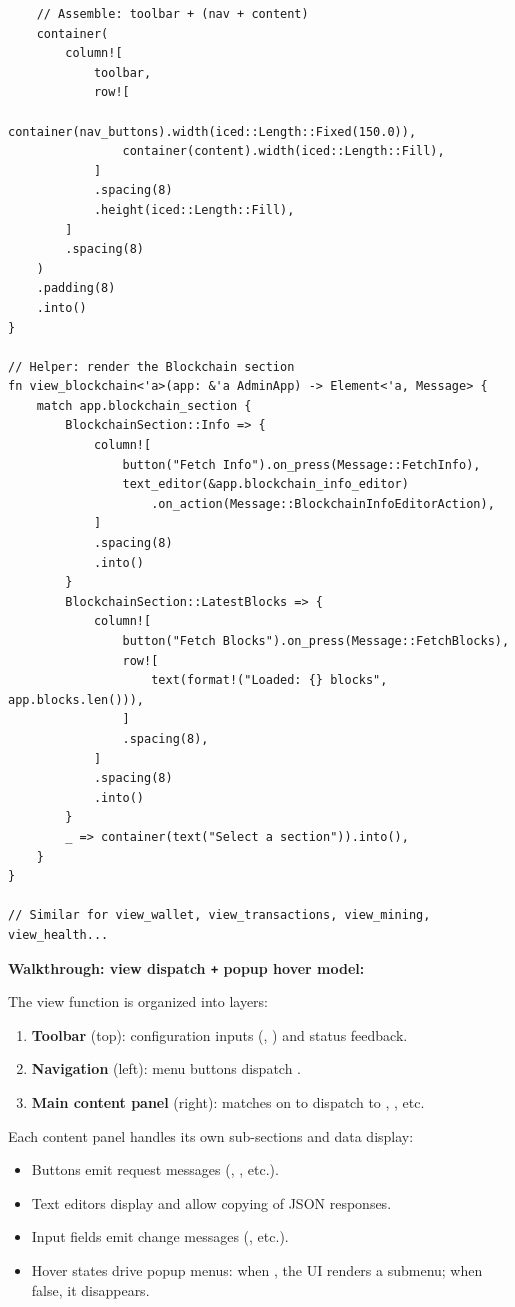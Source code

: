\begin{listing}[H]
\begin{verbatim}
    // Assemble: toolbar + (nav + content)
    container(
        column![
            toolbar,
            row![
                container(nav_buttons).width(iced::Length::Fixed(150.0)),
                container(content).width(iced::Length::Fill),
            ]
            .spacing(8)
            .height(iced::Length::Fill),
        ]
        .spacing(8)
    )
    .padding(8)
    .into()
}

// Helper: render the Blockchain section
fn view_blockchain<'a>(app: &'a AdminApp) -> Element<'a, Message> {
    match app.blockchain_section {
        BlockchainSection::Info => {
            column![
                button("Fetch Info").on_press(Message::FetchInfo),
                text_editor(&app.blockchain_info_editor)
                    .on_action(Message::BlockchainInfoEditorAction),
            ]
            .spacing(8)
            .into()
        }
        BlockchainSection::LatestBlocks => {
            column![
                button("Fetch Blocks").on_press(Message::FetchBlocks),
                row![
                    text(format!("Loaded: {} blocks", app.blocks.len())),
                ]
                .spacing(8),
            ]
            .spacing(8)
            .into()
        }
        _ => container(text("Select a section")).into(),
    }
}

// Similar for view_wallet, view_transactions, view_mining, view_health...
\end{verbatim}
\end{listing}

\textbf{Walkthrough: view dispatch \texttt{+} popup hover model:}

The view function is organized into layers:

\begin{enumerate}
  \item \textbf{Toolbar} (top): configuration inputs (, ) and status feedback.
  \item \textbf{Navigation} (left): menu buttons dispatch .
  \item \textbf{Main content panel} (right): matches on  to dispatch to , , etc.
\end{enumerate}

Each content panel handles its own sub-sections and data display:

\begin{itemize}
  \item Buttons emit request messages (, , etc.).
  \item Text editors display and allow copying of JSON responses.
  \item Input fields emit change messages (, etc.).
  \item Hover states drive popup menus: when , the UI renders a submenu; when false, it disappears.
\end{itemize}

